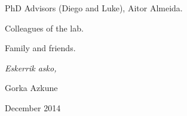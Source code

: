 


\begin{acknowledgements}      
PhD Advisors (Diego and Luke), Aitor Almeida.

Colleagues of the lab.

Family and friends.


\begin{flushright}
\textit{Eskerrik asko,}

Gorka Azkune

December 2014







\end{flushright}



\end{acknowledgements}



